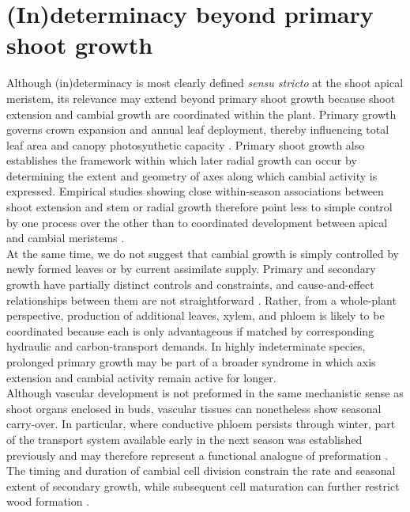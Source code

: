 \documentclass{article}
\begin{document}
	\section*{(In)determinacy beyond primary shoot growth} 
	Although (in)determinacy is most clearly defined \textit{sensu stricto} at the shoot apical meristem, its relevance may extend beyond primary shoot growth because shoot extension and cambial growth are coordinated within the plant. Primary growth governs crown expansion and annual leaf deployment, thereby influencing total leaf area and canopy photosynthetic capacity \citep{girardPolycyclismFundamentalTree2011, soolanayakanahallyComparativePhysiologyAllopatric2015}. Primary shoot growth also establishes the framework within which later radial growth can occur by determining the extent and geometry of axes along which cambial activity is expressed. Empirical studies showing close within-season associations between shoot extension and stem or radial growth therefore point less to simple control by one process over the other than to coordinated development between apical and cambial meristems \citep{cunyLifeStrategiesIntraannual2012, zhangForestsGrowthMonitoring2019}.\\
	
	At the same time, we do not suggest that cambial growth is simply controlled by newly formed leaves or by current assimilate supply. Primary and secondary growth have partially distinct controls and constraints, and cause-and-effect relationships between them are not straightforward \citep{hartmannUnderstandingRolesNonstructural2016a, trugmanSourceVsSink2025, cabonDistalProximalContinuum2026}. Rather, from a whole-plant perspective, production of additional leaves, xylem, and phloem is likely to be coordinated because each is only advantageous if matched by corresponding hydraulic and carbon-transport demands. In highly indeterminate species, prolonged primary growth may be part of a broader syndrome in which axis extension and cambial activity remain active for longer.\\
	
	Although vascular development is not preformed in the same mechanistic sense as shoot organs enclosed in buds, vascular tissues can nonetheless show seasonal carry-over. In particular, where conductive phloem persists through winter, part of the transport system available early in the next season was established previously and may therefore represent a functional analogue of preformation \citep{savageItsAllTiming2020, savageCoordinationSpringVascular2021}. The timing and duration of cambial cell division constrain the rate and seasonal extent of secondary growth, while subsequent cell maturation can further restrict wood formation \citep{lupiXylemPhenologyWood2010}. 
	
\end{document}
